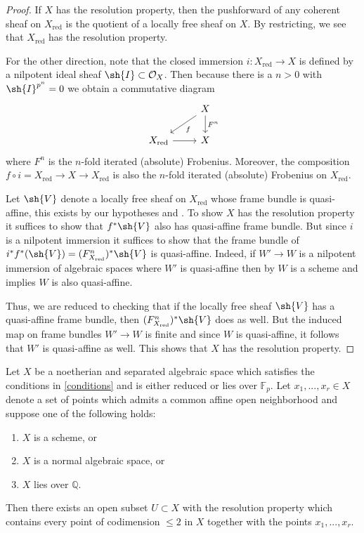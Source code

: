 \documentclass[12pt]{amsart}
\begin{document}
\begin{proof} If $X$ has the resolution property, then the pushforward of any coherent sheaf on $X_{\mathrm{red}}$ is the quotient of a locally free sheaf on $X$. By restricting, we see that $X_{\text{red}}$ has the resolution property. 

For the other direction, note that the closed immersion $i: X_{\text{red}} \to X$ is defined by a nilpotent ideal sheaf $\sh{I} \subset \mathcal{O}_X$. Then because there is a $n>0$ with $\sh{I}^{p^n}=0$ we obtain a commutative diagram
$$
\begin{tikzcd} 
						& X\ar[ld, "f"] \ar[d,"F^n"]\\	 
X_{\text{red}} \ar[r]	& X
\end{tikzcd}
$$
where $F^n$ is the $n$-fold iterated (absolute) Frobenius. Moreover, the composition $f \circ i=X_{\text{red}} \to X \to X_{\text{red}}$ is also the $n$-fold iterated (absolute) Frobenius on $X_{\text{red}}$. 

Let $\sh{V}$ denote a locally free sheaf on $X_{\text{red}}$ whose frame bundle is quasi-affine, this exists by our hypotheses and \cite[Thm. 1.1]{GrossRes}. To show $X$ has the resolution property it suffices to show that $f^*\sh{V}$ also has quasi-affine frame bundle. But since $i$ is a nilpotent immersion it suffices to show that the frame bundle of $i^*f^*(\sh{V})=(F_{X_{\text{red}}}^n)^*\sh{V}$ is quasi-affine. Indeed, if $W' \to W$ is a nilpotent immersion of algebraic spaces where $W'$ is quasi-affine then by \cite[Prop. 3.5]{GrossRes} $W$ is a scheme and \cite[Tag 0B7L]{stacks} implies $W$ is also quasi-affine. 

Thus, we are reduced to checking that if the locally free sheaf $\sh{V}$ has a quasi-affine frame bundle, then $(F_{X_{\text{red}}}^n)^*\sh{V}$ does as well. But the induced map on frame bundles $W' \to W$ is finite and since $W$ is quasi-affine, it follows that $W'$ is quasi-affine as well. This shows that $X$ has the resolution property. \end{proof}


\begin{Theorem} \label{resolutionthree} Let $X$ be a noetherian and separated algebraic space which satisfies the conditions in \ref{conditions} and is either reduced or lies over $\mathbb{F}_p$. Let $x_1,...,x_r \in X$ denote a set of points which admits a common affine open neighborhood and suppose one of the following holds:\begin{enumerate}
\item $X$ is a scheme, or
\item $X$ is a normal algebraic space, or
\item $X$ lies over $\mathbb{Q}$.
\end{enumerate}
Then there exists an open subset $U \subset X$ with the resolution property which contains every point of codimension $\leq 2$ in $X$ together with the points $x_1,...,x_r$.
 \end{Theorem} 
\end{document}
